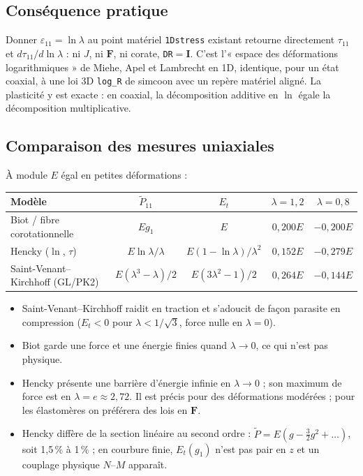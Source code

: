 \documentclass[11pt,a4paper]{article}
\newcommand{\code}[1]{\texttt{#1}}
\begin{document}
\subsection{Conséquence pratique}
Donner $\varepsilon_{11}=\ln\lambda$ au point matériel \code{1Dstress} existant
retourne directement $\tau_{11}$ et $d\tau_{11}/d\ln\lambda$ : ni $J$, ni
$\mathbf F$, ni corate, \code{DR}$=\mathbf I$. C'est l'« espace des
déformations logarithmiques » de Miehe, Apel et Lambrecht \cite{miehe2002} en 1D,
identique, pour un état coaxial, à une loi 3D \code{log\_R} de simcoon avec un
repère matériel aligné. La plasticité y est exacte : en coaxial, la décomposition
additive en $\ln$ égale la décomposition multiplicative.

\subsection{Comparaison des mesures uniaxiales}
À module $E$ égal en petites déformations :
\begin{center}
\small
\begin{tabular}{lcccc}
\toprule
Modèle & $\tilde P_{11}$ & $E_t$ & $\lambda=1{,}2$ & $\lambda=0{,}8$\\
\midrule
Biot / fibre corotationnelle & $Eg_1$ & $E$ & $0{,}200E$ & $-0{,}200E$\\
Hencky ($\ln$, $\tau$) & $E\ln\lambda/\lambda$ & $E(1-\ln\lambda)/\lambda^2$ & $0{,}152E$ & $-0{,}279E$\\
Saint-Venant--Kirchhoff (GL/PK2) & $E(\lambda^3-\lambda)/2$ & $E(3\lambda^2-1)/2$ & $0{,}264E$ & $-0{,}144E$\\
\bottomrule
\end{tabular}
\end{center}
\begin{itemize}
\item Saint-Venant--Kirchhoff raidit en traction et s'adoucit de façon parasite
en compression ($E_t<0$ pour $\lambda<1/\sqrt3$, force nulle en $\lambda=0$).
\item Biot garde une force et une énergie finies quand $\lambda\to0$, ce qui
n'est pas physique.
\item Hencky présente une barrière d'énergie infinie en $\lambda\to0$ ; son
maximum de force est en $\lambda=e\approx2{,}72$. Il est précis pour des déformations
modérées \cite{anand1979,bruhns2001} ; pour les élastomères on préférera des lois
en $\mathbf F$.
\item Hencky diffère de la section linéaire au second ordre :
$\tilde P=E(g-\tfrac32g^2+\dots)$, soit 1,5\,\% à 1\,\% ; en courbure finie,
$E_t(g_1)$ n'est pas pair en $z$ et un couplage physique $N$--$M$ apparaît.
\end{itemize}
\end{document}
